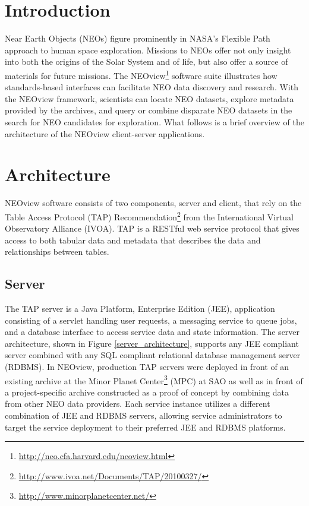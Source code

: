 \section{Introduction}
Near Earth Objects (NEOs) figure prominently in NASA's Flexible Path approach to human space exploration\citep{flexible_path}.  Missions to NEOs offer not only insight into both the origins of the Solar System and of life, but also offer a source of materials for future missions.  The NEOview\footnote{\url{http://neo.cfa.harvard.edu/neoview.html}} software suite illustrates how standards-based interfaces can facilitate NEO data discovery and research.  With the NEOview framework, scientists can locate NEO datasets, explore metadata provided by the archives, and query or combine disparate NEO datasets in the search for NEO candidates for exploration.  What follows is a brief overview of the architecture of the NEOview client-server applications.

\section{Architecture}
NEOview software consists of two components, server and client, that rely on the Table Access Protocol (TAP) Recommendation\footnote{\url{http://www.ivoa.net/Documents/TAP/20100327/}} from the International Virtual Observatory Alliance (IVOA).  TAP is a RESTful web service protocol that gives access to both tabular data and metadata that describes the data and relationships between tables.

\subsection{Server}
The TAP server is a Java Platform, Enterprise Edition (JEE), application consisting of a servlet handling user requests, a messaging service to queue jobs, and a database interface to access service data and state information.  The server architecture, shown in Figure \ref{server_architecture}, supports any JEE compliant server combined with any SQL compliant relational database management server (RDBMS).  In NEOview, production TAP servers were deployed in front of an existing archive at the Minor Planet Center\footnote{\url{http://www.minorplanetcenter.net/}} (MPC) at SAO as well as in front of a project-specific archive constructed as a proof of concept by combining data from other NEO data providers.  Each service instance utilizes a different combination of JEE and RDBMS servers, allowing service administrators to target the service deployment to their preferred JEE and RDBMS platforms.

